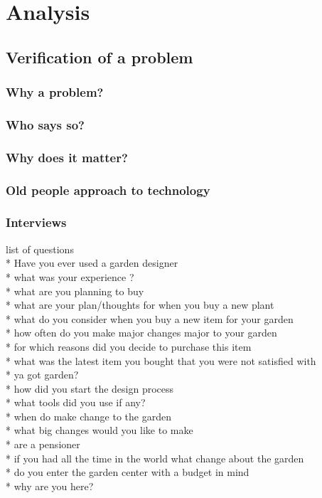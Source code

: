 \chapter{Analysis}
	
	
	\section{Verification of a problem}\label{sec:verification}
		\subsection{Why a problem?}
		
		\subsection{Who says so?}
		
		\subsection{Why does it matter?}
		
		\subsection{Old people approach to technology}
		\subsection{Interviews}
		list of questions\\
		* Have you ever used a garden designer \\
		* what was your experience ?	\\
		* what are you planning to buy	\\
		* what are your plan/thoughts for when you buy a new plant\\
		* what do you consider when you buy a new item for your garden\\
		* how often do you make major changes major to your garden	\\
		* for which reasons did you decide to purchase this item	\\
		* what was the latest item you bought that you were not satisfied with\\ 
		* ya got garden? \\
		* how did you start the design process\\
		* what tools did you use if any?\\
		* when do make change to the garden\\
		* what big changes would you like to make\\
		* are a pensioner\\
		* if you had all the time in the world what change about the garden\\
		* do you enter the garden center with a budget in mind\\
		* why are you here?\\

